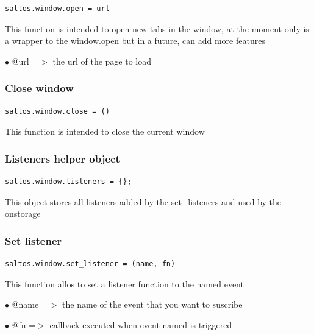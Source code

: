 \documentclass[a4paper]{article}
\begin{document}
\begin{lstlisting}
saltos.window.open = url
\end{lstlisting}

This function is intended to open new tabs in the window, at the moment only is a wrapper to
the window.open but in a future, can add more features

\begin{compactitem}
\item[\color{myblue}$\bullet$] @url =$>$ the url of the page to load
\end{compactitem}

\hypertarget{toc308}{}
\subsubsection{Close window}

\begin{lstlisting}
saltos.window.close = ()
\end{lstlisting}

This function is intended to close the current window

\hypertarget{toc309}{}
\subsubsection{Listeners helper object}

\begin{lstlisting}
saltos.window.listeners = {};
\end{lstlisting}

This object stores all listeners added by the set\_listeners and used by the onstorage

\hypertarget{toc310}{}
\subsubsection{Set listener}

\begin{lstlisting}
saltos.window.set_listener = (name, fn)
\end{lstlisting}

This function allos to set a listener function to the named event

\begin{compactitem}
\item[\color{myblue}$\bullet$] @name =$>$ the name of the event that you want to suscribe
\item[\color{myblue}$\bullet$] @fn   =$>$ callback executed when event named is triggered
\end{compactitem}
\end{document}
